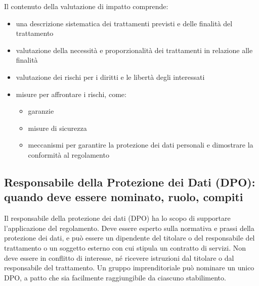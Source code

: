 Il contenuto della valutazione di impatto comprende:
\begin{itemize}
    \item una descrizione sistematica dei trattamenti previsti e delle finalità del trattamento
    \item valutazione della necessità e proporzionalità dei trattamenti in relazione alle finalità
    \item valutazione dei rischi per i diritti e le libertà degli interessati
    \item misure per affrontare i rischi, come:
    \begin{itemize}
        \item garanzie
        \item misure di sicurezza
        \item meccanismi per garantire la protezione dei dati personali e dimostrare la conformità al regolamento
    \end{itemize}
\end{itemize}

\subsection{Responsabile della Protezione dei Dati (DPO): quando deve essere nominato, ruolo, compiti}

Il responsabile della protezione dei dati (DPO) ha lo scopo di supportare l'applicazione del regolamento.
Deve essere esperto sulla normativa e prassi della protezione dei dati, e può
essere un dipendente del titolare o del responsabile del trattamento o un
soggetto esterno con cui stipula un contratto di servizi.
\newline
Non deve essere in conflitto di interesse, né ricevere istruzioni dal titolare o dal responsabile del trattamento.
Un gruppo imprenditoriale può nominare un unico DPO, a patto che sia facilmente raggiungibile da ciascuno stabilimento.

